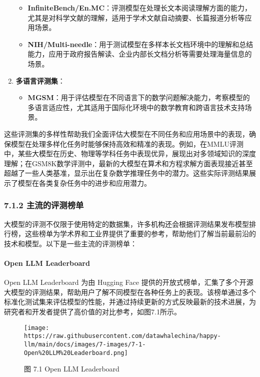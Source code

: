 \documentclass[12pt,a4paper]{book}
\begin{document}
\begin{enumerate}
  \begin{itemize}
  \tightlist
  \item
    \textbf{InfiniteBench/En.MC}：评测模型在处理长文本阅读理解方面的能力，尤其是对科学文献的理解，适用于学术文献自动摘要、长篇报道分析等应用场景。
  \item
    \textbf{NIH/Multi-needle}：用于测试模型在多样本长文档环境中的理解和总结能力，应用于政府报告解读、企业内部长文档分析等需要处理海量信息的场景。
  \end{itemize}
\item
  \textbf{多语言评测集}：

  \begin{itemize}
  \tightlist
  \item
    \textbf{MGSM}：用于评估模型在不同语言下的数学问题解决能力，考察模型的多语言适应性，尤其适用于国际化环境中的数学教育和跨语言技术支持场景。
  \end{itemize}
\end{enumerate}

这些评测集的多样性帮助我们全面评估大模型在不同任务和应用场景中的表现，确保模型在处理多样化任务时能够保持高效和精准的表现。例如，在MMLU评测中，某些大模型在历史、物理等学科任务中表现优异，展现出对多领域知识的深度理解；在GSM8K数学评测中，最新的大模型在算术和方程求解方面表现接近甚至超越了一些人类基准，显示出在复杂数学推理任务中的潜力。这些实际评测结果展示了模型在各类复杂任务中的进步和应用潜力。

\subsubsection{7.1.2
主流的评测榜单}\label{ux4e3bux6d41ux7684ux8bc4ux6d4bux699cux5355}

大模型的评测不仅限于使用特定的数据集，许多机构还会根据评测结果发布模型排行榜，这些榜单为学术界和工业界提供了重要的参考，帮助他们了解当前最前沿的技术和模型。以下是一些主流的评测榜单：

\paragraph{Open LLM Leaderboard}\label{open-llm-leaderboard}

Open LLM Leaderboard 为由 Hugging Face
提供的开放式榜单，汇集了多个开源大模型的评测结果，帮助用户了解不同模型在各种任务上的表现。该榜单通过多个标准化测试集来评估模型的性能，并通过持续更新的方式反映最新的技术进展，为研究者和开发者提供了高价值的对比参考，如图7.1所示。

\begin{figure}[htbp]\centering
\texttt{[image: https://raw.githubusercontent.com/datawhalechina/happy-llm/main/docs/images/7-images/7-1-Open\%20LLM\%20Leaderboard.png]}
\caption{图 7.1 Open LLM Leaderboard}
\end{figure}
\end{document}
